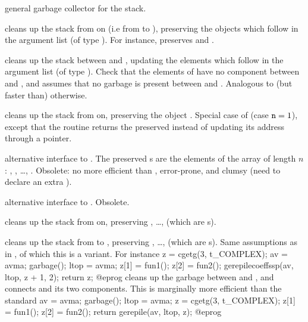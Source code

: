  general garbage collector
for the stack.

 cleans up the stack from
 on (i.e from  to ), preserving the  objects
which follow in the argument list (of type ). For instance,
 preserves  and .

cleans up the stack between  and , updating
the  elements which follow  in the argument list (of type
). Check that the elements of  have no component between
 and , and assumes that no garbage is present between
 and . Analogous to (but faster than) 
otherwise.

 cleans up the stack  from
 on, preserving the object . Special case of 
(case ${\tt n} = 1$), except that the routine returns the preserved 
instead of updating its address through a pointer.

 alternative interface
to . The preserved s are the elements of the array
 of length $n$: , , \dots,
. Obsolete: no more efficient than ,
error-prone, and clumsy (need to declare an extra ).

alternative interface to . Obsolete.

 cleans up the stack
from  on, preserving , \dots,  (which are
s).

cleans up the stack from  to , preserving ,
\dots,  (which are s). Same assumptions as in
, of which this is a variant. For instance
\bprog
  z = cgetg(3, t_COMPLEX);
  av = avma; garbage(); ltop = avma;
  z[1] = fun1();
  z[2] = fun2();
  gerepilecoeffssp(av, ltop, z + 1, 2);
  return z;
@eprog\noindent
cleans up the garbage between  and , and connects 
and its two components. This is marginally more efficient than the standard
\bprog
  av = avma; garbage(); ltop = avma;
  z = cgetg(3, t_COMPLEX);
  z[1] = fun1();
  z[2] = fun2(); return gerepile(av, ltop, z);
@eprog\noindent

